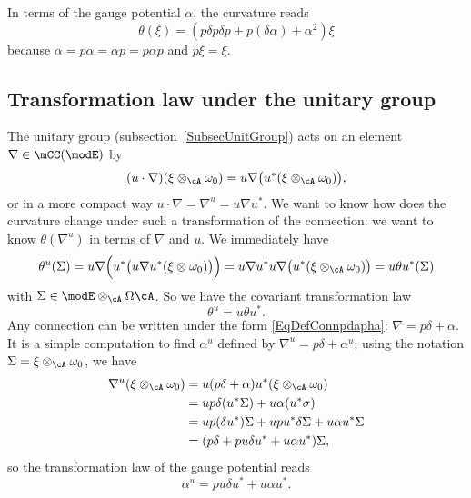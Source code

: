In terms of the gauge potential $\alpha$, the curvature reads
\begin{equation}		\label{EqConnPotalpha}
	\theta(\xi)=(p\delta p\delta p+p(\delta\alpha)+\alpha^2)\xi
\end{equation}
because $\alpha=p\alpha=\alpha p=p\alpha p$ and $p\xi=\xi$.


\subsection{Transformation law under the unitary group}

The unitary group (subsection~\ref{SubsecUnitGroup}) acts on an element $\nabla\in\mCC(\modE)$ by
\begin{equation}
	(u\cdot\nabla)(\xi\otimes_{\cA}\omega_0)=u\nabla\big( u^*(\xi\otimes_{\cA}\omega_0) \big),
\end{equation}
or in a more compact way $u\cdot\nabla=\nabla^u=u\nabla u^*$. We want to know how does the curvature change under such a transformation of the connection: we want to know $\theta(\nabla^u)$ in terms of $\nabla$ and $u$. We immediately have
\[
	\theta^u(\Sigma)=u\nabla\Big( u^*\big( u\nabla u^*(\xi\otimes\omega_0) \big) \Big)=u\nabla u^*u\nabla\big( u^*(\xi\otimes_{\cA}\omega_0) \big)=u\theta u^*(\Sigma)
\]
with $\Sigma\in\modE\otimes_{\cA}\Omega\cA$. So we have the covariant transformation law
\begin{equation}
	\theta^u=u\theta u^*.
\end{equation}
Any connection can be written under the form \eqref{EqDefConnpdapha}: $\nabla=p\delta+\alpha$. It is a simple computation to find $\alpha^u$ defined by $\nabla^u=p\delta+\alpha^u$; using the notation $\Sigma=\xi\otimes_{\cA}\omega_0$, we have
\begin{align*}
	\nabla^u(\xi\otimes_{\cA}\omega_0) & = u(p\delta+\alpha)u^*(\xi\otimes_{\cA}\omega_0)           \\
	                                   & = up\delta(u^*\Sigma)+u\alpha(u^*\sigma)                   \\
	                                   & = up(\delta u^*)\Sigma+upu^*\delta\Sigma+u\alpha u^*\Sigma \\
	                                   & = (p\delta+pu\delta u^*+u\alpha u^*)\Sigma,
\end{align*}
so the transformation law of the gauge potential reads
\begin{equation}
	\alpha^u=pu\delta u^*+u\alpha u^*.
\end{equation}


